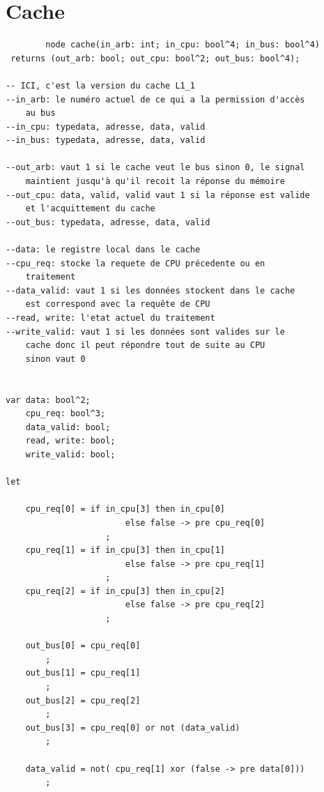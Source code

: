 \documentclass[a4paper,11pt]{report}
\begin{document}
\chapter{Cache}
	\begin{framed}
		\begin{verbatim}
		node cache(in_arb: int; in_cpu: bool^4; in_bus: bool^4)
 returns (out_arb: bool; out_cpu: bool^2; out_bus: bool^4);

-- ICI, c'est la version du cache L1_1
--in_arb: le numéro actuel de ce qui a la permission d'accès 
	au bus
--in_cpu: typedata, adresse, data, valid
--in_bus: typedata, adresse, data, valid

--out_arb: vaut 1 si le cache veut le bus sinon 0, le signal 
	maintient jusqu'à qu'il recoit la réponse du mémoire
--out_cpu: data, valid, valid vaut 1 si la réponse est valide
	et l'acquittement du cache
--out_bus: typedata, adresse, data, valid

--data: le registre local dans le cache
--cpu_req: stocke la requete de CPU précedente ou en 
	traitement
--data_valid: vaut 1 si les données stockent dans le cache 
	est correspond avec la requête de CPU
--read, write: l'etat actuel du traitement
--write_valid: vaut 1 si les données sont valides sur le 
	cache donc il peut répondre tout de suite au CPU 
	sinon vaut 0


var data: bool^2;
    cpu_req: bool^3;
    data_valid: bool;
    read, write: bool;
    write_valid: bool;

let

    cpu_req[0] = if in_cpu[3] then in_cpu[0] 
    					else false -> pre cpu_req[0]
                    ;
    cpu_req[1] = if in_cpu[3] then in_cpu[1] 
    					else false -> pre cpu_req[1]
                    ;
    cpu_req[2] = if in_cpu[3] then in_cpu[2] 
    					else false -> pre cpu_req[2]
                    ;

    out_bus[0] = cpu_req[0]
        ;
    out_bus[1] = cpu_req[1]
        ;
    out_bus[2] = cpu_req[2]
        ;
    out_bus[3] = cpu_req[0] or not (data_valid)
        ;

    data_valid = not( cpu_req[1] xor (false -> pre data[0]))
        ;


\end{verbatim}
\end{framed}
\end{document}
